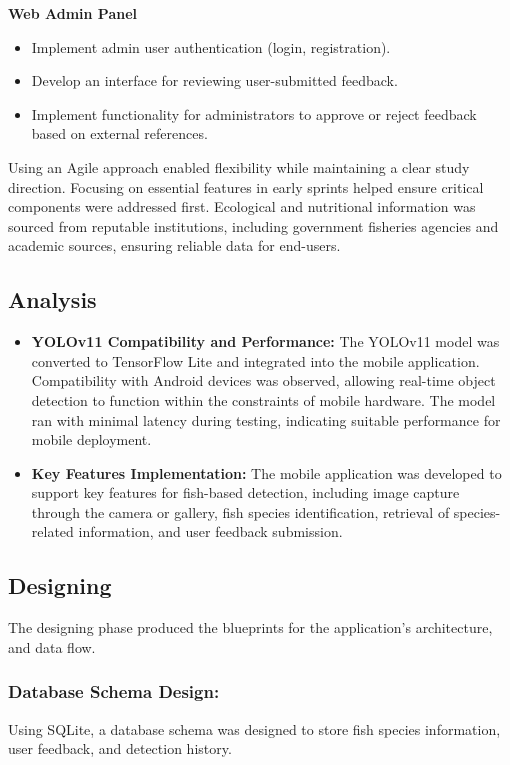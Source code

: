 \noindent\textbf{Web Admin Panel}
\begin{itemize}
    \item Implement admin user authentication (login, registration).
    \item Develop an interface for reviewing user-submitted feedback.
    \item Implement functionality for administrators to approve or reject feedback based on external references.
\end{itemize}


Using an Agile approach enabled flexibility while maintaining a clear study direction. Focusing on essential features in early sprints helped ensure critical components were addressed first. Ecological and nutritional information was sourced from reputable institutions, including government fisheries agencies and academic sources, ensuring reliable data for end-users.


\subsection{Analysis}
\begin{itemize}
\item \textbf{YOLOv11 Compatibility and Performance:}
The YOLOv11 model was converted to TensorFlow Lite and integrated into the mobile application. Compatibility with Android devices was observed, allowing real-time object detection to function within the constraints of mobile hardware. The model ran with minimal latency during testing, indicating suitable performance for mobile deployment.

\item \textbf{Key Features Implementation:}
The mobile application was developed to support key features for fish-based detection, including image capture through the camera or gallery, fish species identification, retrieval of species-related information, and user feedback submission.
\end{itemize}

\subsection{Designing}
The designing phase produced the blueprints for the application's architecture, and data flow.

\subsubsection{Database Schema Design:} Using SQLite, a database schema was designed to store fish species information, user feedback, and detection history.


